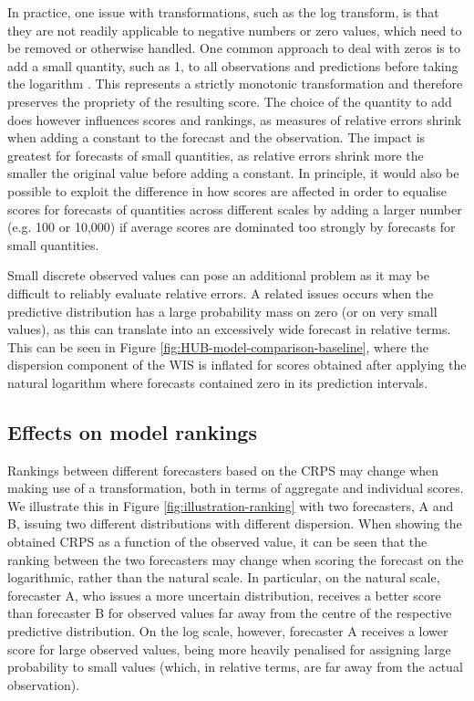 \documentclass{article}
\begin{document}
In practice, one issue with transformations, such as the log transform, is that they are not readily applicable to negative numbers or zero values, which need to be removed or otherwise handled. 
One common approach to deal with zeros is to add a small quantity, such as 1, to all observations and predictions before taking the logarithm \citep{bellegoDealingLogsZeros2022}. This represents a strictly monotonic transformation and therefore preserves the propriety of the resulting score. The choice of the quantity to add does however influences scores and rankings, as measures of relative errors shrink when adding a constant to the forecast and the observation. The impact is greatest for forecasts of small quantities, as relative errors shrink more the smaller the original value before adding a constant. In principle, it would also be possible to exploit the difference in how scores are affected in order to equalise scores for forecasts of quantities across different scales by adding a larger number (e.g. 100 or 10,000) if average scores are dominated too strongly by forecasts for small quantities. 

Small discrete observed values can pose an additional problem as it may be difficult to reliably evaluate relative errors. A related issues occurs when the predictive distribution has a large probability mass on zero (or on very small values), as this can translate into an excessively wide forecast in relative terms. This can be seen in Figure \ref{fig:HUB-model-comparison-baseline}, where the dispersion component of the WIS is inflated for scores obtained after applying the natural logarithm where forecasts contained zero in its prediction intervals. 

\subsection{Effects on model rankings}
\label{sec:methods:rankings}
Rankings between different forecasters based on the CRPS may change when making use of a transformation, both in terms of aggregate and individual scores. We illustrate this in Figure \ref{fig:illustration-ranking} with two forecasters, A and B, issuing two different distributions with different dispersion. When showing the obtained CRPS as a function of the observed value, it can be seen that the ranking between the two forecasters may change when scoring the forecast on the logarithmic, rather than the natural scale. In particular, on the natural scale, forecaster A, who issues a more uncertain distribution, receives a better score than forecaster B for observed values far away from the centre of the respective predictive distribution. On the log scale, however, forecaster A receives a lower score for large observed values, being more heavily penalised for assigning large probability to small values (which, in relative terms, are far away from the actual observation). 
\end{document}
